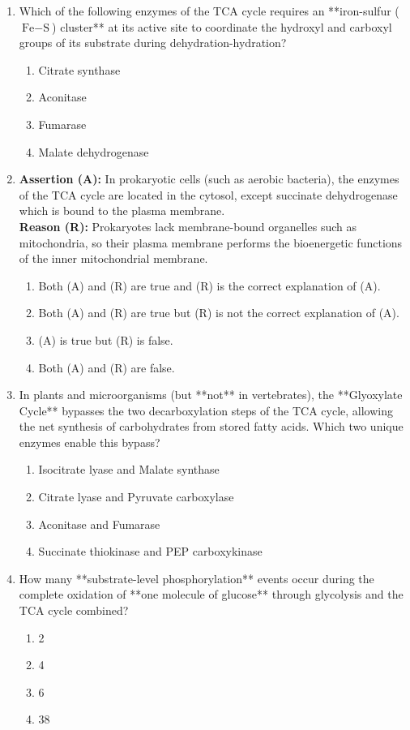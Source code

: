 \documentclass[11pt, a4paper]{article}
\begin{document}
\begin{enumerate}[label=\textbf{\arabic*.}]
\item Which of the following enzymes of the TCA cycle requires an **iron-sulfur ($\text{Fe}-\text{S}$) cluster** at its active site to coordinate the hydroxyl and carboxyl groups of its substrate during dehydration-hydration?
\begin{enumerate}[label=(\Alph*)]
    \item Citrate synthase
    \item Aconitase
    \item Fumarase
    \item Malate dehydrogenase
\end{enumerate}

\item \textbf{Assertion (A):} In prokaryotic cells (such as aerobic bacteria), the enzymes of the TCA cycle are located in the cytosol, except succinate dehydrogenase which is bound to the plasma membrane. \\
\textbf{Reason (R):} Prokaryotes lack membrane-bound organelles such as mitochondria, so their plasma membrane performs the bioenergetic functions of the inner mitochondrial membrane.
\begin{enumerate}[label=(\Alph*)]
    \item Both (A) and (R) are true and (R) is the correct explanation of (A).
    \item Both (A) and (R) are true but (R) is not the correct explanation of (A).
    \item (A) is true but (R) is false.
    \item Both (A) and (R) are false.
\end{enumerate}

\item In plants and microorganisms (but **not** in vertebrates), the **Glyoxylate Cycle** bypasses the two decarboxylation steps of the TCA cycle, allowing the net synthesis of carbohydrates from stored fatty acids. Which two unique enzymes enable this bypass?
\begin{enumerate}[label=(\Alph*)]
    \item Isocitrate lyase and Malate synthase
    \item Citrate lyase and Pyruvate carboxylase
    \item Aconitase and Fumarase
    \item Succinate thiokinase and PEP carboxykinase
\end{enumerate}

\item How many **substrate-level phosphorylation** events occur during the complete oxidation of **one molecule of glucose** through glycolysis and the TCA cycle combined?
\begin{enumerate}[label=(\Alph*)]
    \item 2
    \item 4
    \item 6
    \item 38
\end{enumerate}


\end{enumerate}
\end{document}

